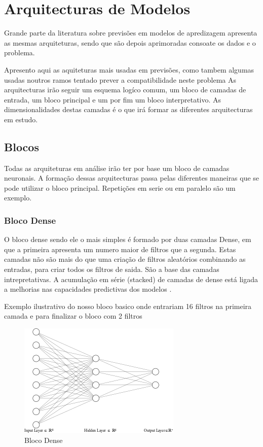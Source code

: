 \chapter{Arquitecturas de Modelos}

Grande parte da literatura sobre previsões em modelos de apredizagem apresenta as mesmas arquiteturas, sendo que são depois aprimoradas consoate os dados e o problema.

Apresento aqui as aquiteturas mais usadas em previsões, como tambem algumas usadas noutros ramos tentado prever a compatibilidade neste problema 
As arquitecturas irão seguir um esquema logíco comum, um bloco de camadas de entrada, um bloco principal e um por fim um bloco interpretativo.
As dimensionalidades destas camadas é o que irá formar as diferentes arquitecturas em estudo.

\section{Blocos  \label{se:blocos}}

Todas as arquiteturas em análise irão ter por base um bloco de camadas neuronais. A formação dessas arquitecturas passa pelas diferentes maneiras que se pode utilizar o bloco principal. Repetições em serie ou em paralelo são um exemplo.

\subsection{Bloco Dense}

O bloco dense sendo ele o mais simples é formado por duas camadas Dense, em que a primeira apresenta um numero maior de filtros que a segunda.
Estas camadas não são mais do que uma criação de filtros aleatórios combinando as entradas, para criar todos os filtros de saida. São a base das camadas intrepretativas. A acumulação em série (stacked) de camadas de dense está ligada a melhorias nas capacidades predictivas dos modelos \cite{VLHelen2021}.

Exemplo ilustrativo do nosso bloco basico onde entrariam 16 filtros na primeira camada e para finalizar o bloco com 2 filtros

\begin{figure}[H]
	\centering
	\includegraphics{Imagens/dense_layer.png}
	\caption{Bloco Dense}
	\label{fig:dense_blcok}
\end{figure}
	
